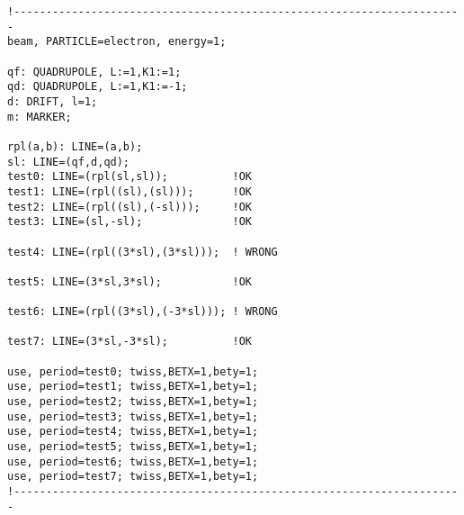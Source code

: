 \begin{verbatim}
!----------------------------------------------------------------------
beam, PARTICLE=electron, energy=1;

qf: QUADRUPOLE, L:=1,K1:=1;
qd: QUADRUPOLE, L:=1,K1:=-1;
d: DRIFT, l=1;
m: MARKER;

rpl(a,b): LINE=(a,b);
sl: LINE=(qf,d,qd);
test0: LINE=(rpl(sl,sl));          !OK 
test1: LINE=(rpl((sl),(sl)));      !OK
test2: LINE=(rpl((sl),(-sl)));     !OK
test3: LINE=(sl,-sl);              !OK

test4: LINE=(rpl((3*sl),(3*sl)));  ! WRONG

test5: LINE=(3*sl,3*sl);           !OK

test6: LINE=(rpl((3*sl),(-3*sl))); ! WRONG

test7: LINE=(3*sl,-3*sl);          !OK

use, period=test0; twiss,BETX=1,bety=1;
use, period=test1; twiss,BETX=1,bety=1;
use, period=test2; twiss,BETX=1,bety=1;
use, period=test3; twiss,BETX=1,bety=1;
use, period=test4; twiss,BETX=1,bety=1;
use, period=test5; twiss,BETX=1,bety=1;
use, period=test6; twiss,BETX=1,bety=1;
use, period=test7; twiss,BETX=1,bety=1;
!----------------------------------------------------------------------
\end{verbatim}

